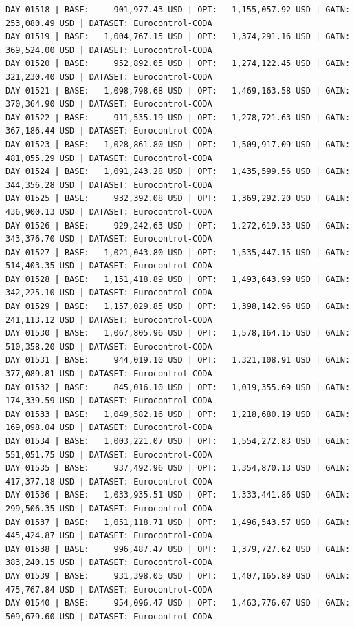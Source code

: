 \documentclass[11pt,a4paper]{article}
\begin{document}
\begin{verbatim}
DAY 01518 | BASE:     901,977.43 USD | OPT:   1,155,057.92 USD | GAIN: 253,080.49 USD | DATASET: Eurocontrol-CODA
DAY 01519 | BASE:   1,004,767.15 USD | OPT:   1,374,291.16 USD | GAIN: 369,524.00 USD | DATASET: Eurocontrol-CODA
DAY 01520 | BASE:     952,892.05 USD | OPT:   1,274,122.45 USD | GAIN: 321,230.40 USD | DATASET: Eurocontrol-CODA
DAY 01521 | BASE:   1,098,798.68 USD | OPT:   1,469,163.58 USD | GAIN: 370,364.90 USD | DATASET: Eurocontrol-CODA
DAY 01522 | BASE:     911,535.19 USD | OPT:   1,278,721.63 USD | GAIN: 367,186.44 USD | DATASET: Eurocontrol-CODA
DAY 01523 | BASE:   1,028,861.80 USD | OPT:   1,509,917.09 USD | GAIN: 481,055.29 USD | DATASET: Eurocontrol-CODA
DAY 01524 | BASE:   1,091,243.28 USD | OPT:   1,435,599.56 USD | GAIN: 344,356.28 USD | DATASET: Eurocontrol-CODA
DAY 01525 | BASE:     932,392.08 USD | OPT:   1,369,292.20 USD | GAIN: 436,900.13 USD | DATASET: Eurocontrol-CODA
DAY 01526 | BASE:     929,242.63 USD | OPT:   1,272,619.33 USD | GAIN: 343,376.70 USD | DATASET: Eurocontrol-CODA
DAY 01527 | BASE:   1,021,043.80 USD | OPT:   1,535,447.15 USD | GAIN: 514,403.35 USD | DATASET: Eurocontrol-CODA
DAY 01528 | BASE:   1,151,418.89 USD | OPT:   1,493,643.99 USD | GAIN: 342,225.10 USD | DATASET: Eurocontrol-CODA
DAY 01529 | BASE:   1,157,029.85 USD | OPT:   1,398,142.96 USD | GAIN: 241,113.12 USD | DATASET: Eurocontrol-CODA
DAY 01530 | BASE:   1,067,805.96 USD | OPT:   1,578,164.15 USD | GAIN: 510,358.20 USD | DATASET: Eurocontrol-CODA
DAY 01531 | BASE:     944,019.10 USD | OPT:   1,321,108.91 USD | GAIN: 377,089.81 USD | DATASET: Eurocontrol-CODA
DAY 01532 | BASE:     845,016.10 USD | OPT:   1,019,355.69 USD | GAIN: 174,339.59 USD | DATASET: Eurocontrol-CODA
DAY 01533 | BASE:   1,049,582.16 USD | OPT:   1,218,680.19 USD | GAIN: 169,098.04 USD | DATASET: Eurocontrol-CODA
DAY 01534 | BASE:   1,003,221.07 USD | OPT:   1,554,272.83 USD | GAIN: 551,051.75 USD | DATASET: Eurocontrol-CODA
DAY 01535 | BASE:     937,492.96 USD | OPT:   1,354,870.13 USD | GAIN: 417,377.18 USD | DATASET: Eurocontrol-CODA
DAY 01536 | BASE:   1,033,935.51 USD | OPT:   1,333,441.86 USD | GAIN: 299,506.35 USD | DATASET: Eurocontrol-CODA
DAY 01537 | BASE:   1,051,118.71 USD | OPT:   1,496,543.57 USD | GAIN: 445,424.87 USD | DATASET: Eurocontrol-CODA
DAY 01538 | BASE:     996,487.47 USD | OPT:   1,379,727.62 USD | GAIN: 383,240.15 USD | DATASET: Eurocontrol-CODA
DAY 01539 | BASE:     931,398.05 USD | OPT:   1,407,165.89 USD | GAIN: 475,767.84 USD | DATASET: Eurocontrol-CODA
DAY 01540 | BASE:     954,096.47 USD | OPT:   1,463,776.07 USD | GAIN: 509,679.60 USD | DATASET: Eurocontrol-CODA

\end{verbatim}
\end{document}
